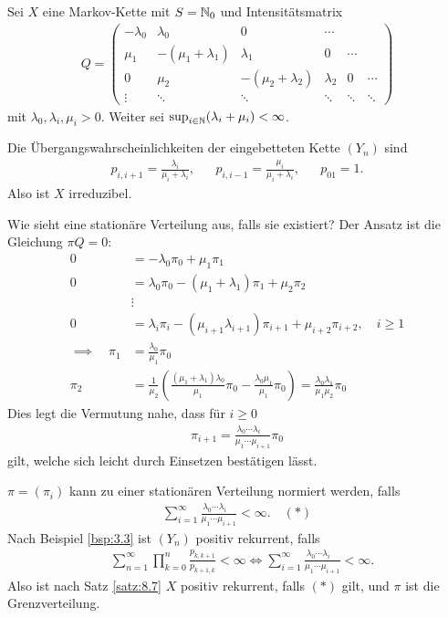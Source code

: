 \documentclass[a4paper,twoside,DIV15,BCOR12mm]{scrbook}
\begin{document}
\begin{beispiel}
Sei $X$ eine Markov-Kette mit $S=\mathbb{N}_0$ und Intensitätsmatrix 
\begin{align*}
Q=
\begin{pmatrix}
-\lambda_0 & \lambda_0 & 0 & \cdots \\
\mu_1  & -(\mu_1 + \lambda_1) & \lambda _1 & 0 & \cdots  \\
0 & \mu_2 & -(\mu_2 + \lambda_2) & \lambda_2 & 0 & \cdots \\
\vdots &\ddots & \ddots & \ddots & \ddots & \ddots
\end{pmatrix}
\end{align*}
mit $\lambda_0,\lambda_i,\mu_i>0$. Weiter sei $\sup_{i\in \mathbb{N}}(\lambda_i+\mu_i) <\infty$.

Die Übergangswahrscheinlichkeiten der eingebetteten Kette $(Y_n)$ sind
\begin{align*}
p_{i,i+1} = \frac{\lambda_i}{\mu_i+\lambda_i}, && p_{i,i-1} = \frac{\mu_i}{\mu_i+\lambda_i}, && p_{01} = 1.
\end{align*}
Also ist $X$ irreduzibel.

Wie sieht eine stationäre Verteilung aus, falls sie existiert?
Der Ansatz ist die Gleichung $\pi Q=0$:
\begin{align*}
0 &= -\lambda_0\pi_0 + \mu_1\pi_1 \\
0 &= \lambda_0\pi_0 - (\mu_1 + \lambda_1)\pi_1 + \mu_2\pi_2 \\
&\vdots \\
0 &= \lambda_i\pi_i - (\mu_{i+1} \lambda_{i+1})\pi_{i+1} + \mu_{i+2}\pi_{i+2},\quad i\ge 1 \\
\implies \quad \pi_1 &= \frac{\lambda_0}{\mu_1} \pi_0 \\
\pi_2  &= \frac{1}{\mu_2}(\frac{(\mu_1+\lambda_1)\lambda_0}{\mu_1}\pi_0 - \frac{\lambda_0\mu_1}{\mu_1}\pi_0) = \frac{\lambda_0\lambda_1}{\mu_1\mu_2}\pi_0
\end{align*}
Dies legt die Vermutung nahe, dass für $i\ge 0$
\begin{align*}
\pi_{i+1} = \frac{\lambda_0\cdots\lambda_{i\phantom{+1}}}{\mu_1\cdots\mu_{i+1}}\pi_0
\end{align*}
gilt, welche sich leicht durch Einsetzen bestätigen lässt.

$\pi=(\pi_i)$ kann zu einer stationären Verteilung normiert werden, falls 
\begin{align*}
\sum_{i=1}^\infty \frac{\lambda_0\cdots\lambda_{i\phantom{+1}}}{\mu_1\cdots\mu_{i+1}}<\infty. \quad (*)
\end{align*}
Nach Beispiel \ref{bsp:3.3} ist $(Y_n)$ positiv rekurrent, falls
\begin{align*}
&\sum_{n=1}^\infty \prod_{k=0}^n \frac{p_{k,k+1}}{p_{k+1,k}} < \infty 
\iff  \sum_{i=1}^\infty  \frac{\lambda_0\cdots\lambda_{i\phantom{+1}}}{\mu_1\cdots\mu_{i+1}}<\infty.
\end{align*}
Also ist nach Satz \ref{satz:8.7} $X$ positiv rekurrent, falls $(*)$ gilt, und $\pi$ ist die Grenzverteilung.


\end{beispiel}
\end{document}
